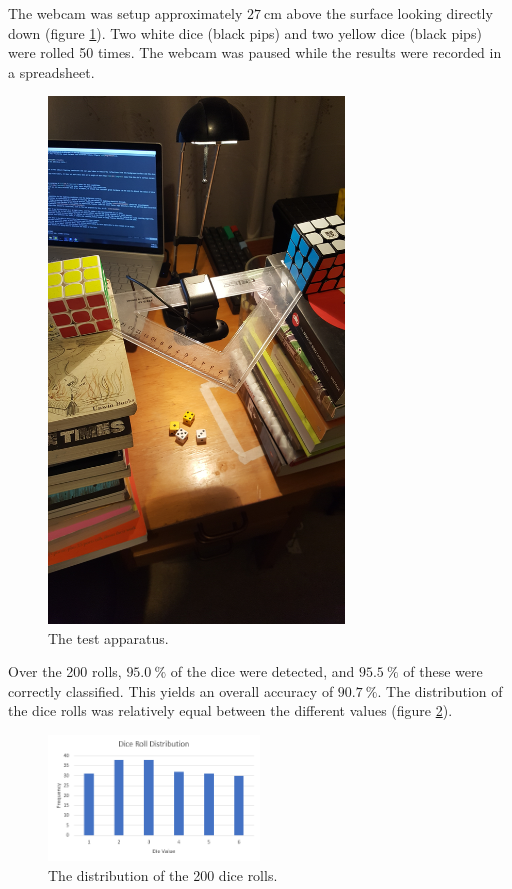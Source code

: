 \documentclass[conference]{IEEEtran}
\begin{document}
The webcam was setup approximately $\SI{27}{\centi\metre}$ above the surface looking directly down (figure \ref{fig:test}). 
Two white dice (black pips) and two yellow dice (black pips) were rolled 50 times.
The webcam was paused while the results were recorded in a spreadsheet.
\begin{figure}
	\centering
	\includegraphics[width=0.7\textwidth, angle=270, origin=c]{test}
	\caption{The test apparatus.}
	\label{fig:test}
\end{figure}

Over the 200 rolls, $\SI{95.0}{\percent}$ of the dice were detected, and $\SI{95.5}{\percent}$ of these were correctly classified.
This yields an overall accuracy of $\SI{90.7}{\percent}$.
The distribution of the dice rolls was relatively equal between the different values (figure \ref{fig:results}).
\begin{figure}
	\centering
	\includegraphics[width=0.5\textwidth]{results}
	\caption{The distribution of the 200 dice rolls.}
	\label{fig:results}
\end{figure}
\end{document}
